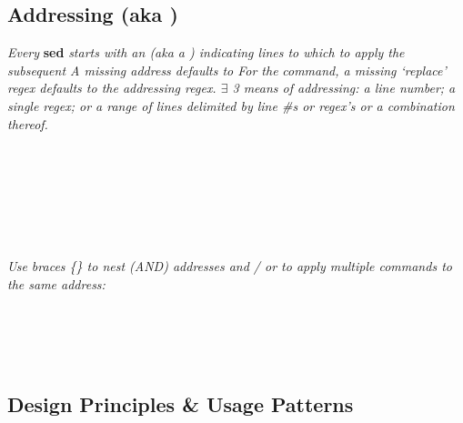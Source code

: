 \subsection*{Addressing (aka )}
\textit{Every }\textbf{sed}\textit{  starts with an  (aka a ) indicating lines to which to apply the subsequent  A missing address defaults to  For the }\textit{ command, a missing `replace' regex defaults to the addressing regex. $\exists$ 3 means of addressing: a line number; a single regex; or a range of lines delimited by line \#s or regex's or a combination thereof.}\\
\\
\\
\\
\\
\\
\\
\\[1mm]
\textit{Use braces \{\} to nest (AND) addresses and / or to apply multiple commands to the same address:}\\
\\
\\
\\
\\



\subsection*{Design Principles \& Usage Patterns}


